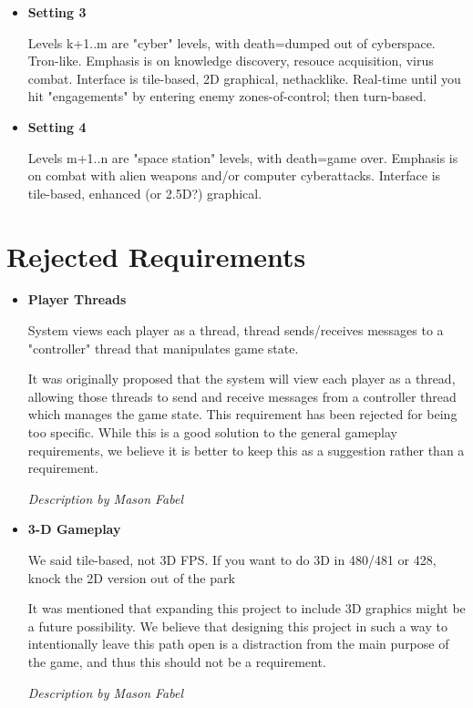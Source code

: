 \documentclass[12pt]{report}
\begin{document}
\begin{itemize}
	\item \textbf{Setting 3}
	
	Levels k+1..m are "cyber" levels, with death=dumped out of cyberspace.
	Tron-like. Emphasis is on knowledge discovery, resouce acquisition,
	virus combat. Interface is tile-based, 2D graphical, nethacklike.
	Real-time until you hit "engagements" by entering enemy
	zones-of-control; then turn-based.
	
	\item \textbf{Setting 4}
	
	Levels m+1..n are "space station" levels, with death=game over.
	Emphasis is on combat with alien weapons and/or computer cyberattacks.
	Interface is tile-based, enhanced (or 2.5D?) graphical. 
\end{itemize}

\section{Rejected Requirements}
\begin{itemize}
	\item \textbf{Player Threads}
	
	System views each player as a thread, thread sends/receives messages
	to a "controller" thread that manipulates game state.
	
	It was originally proposed that the system will view each player as a
	thread, allowing those threads to send and receive messages from a
	controller thread which manages the game state. This requirement has been
	rejected for being too specific. While this is a good solution to the
	general gameplay requirements, we believe it is better to keep this as a
	suggestion rather than a requirement.
	
	\emph{Description by Mason Fabel}
		
	\item \textbf{3-D Gameplay}
	
	We said tile-based, not 3D FPS. If you want to do 3D in 480/481 or
	428, knock the 2D version out of the park 
	
	It was mentioned that expanding this project to include 3D graphics might
	be a future possibility. We believe that designing this project in such a
	way to intentionally leave this path open is a distraction from the main
	purpose of the game, and thus this should not be a requirement.
	
	\emph{Description by Mason Fabel}
	
\end{itemize}
\end{document}
